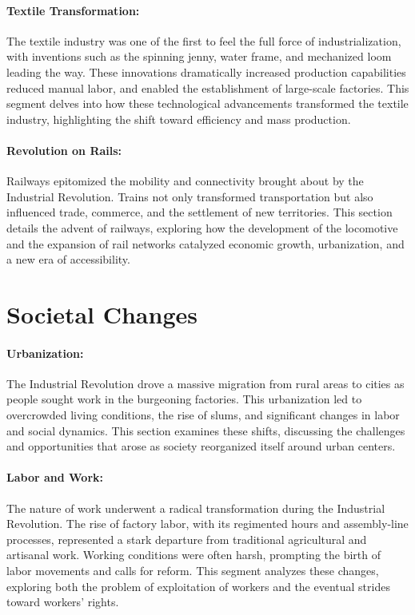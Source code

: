 \documentclass[a4paper,12pt]{book}
\begin{document}
\paragraph{Textile Transformation:}
The textile industry was one of the first to feel the full force of industrialization, with inventions such as the spinning jenny, water frame, and mechanized loom leading the way. These innovations dramatically increased production capabilities reduced manual labor, and enabled the establishment of large-scale factories. This segment delves into how these technological advancements transformed the textile industry, highlighting the shift toward efficiency and mass production.

\paragraph{Revolution on Rails:}
Railways epitomized the mobility and connectivity brought about by the Industrial Revolution. Trains not only transformed transportation but also influenced trade, commerce, and the settlement of new territories. This section details the advent of railways, exploring how the development of the locomotive and the expansion of rail networks catalyzed economic growth, urbanization, and a new era of accessibility.

\section*{Societal Changes}

\paragraph{Urbanization:}
The Industrial Revolution drove a massive migration from rural areas to cities as people sought work in the burgeoning factories. This urbanization led to overcrowded living conditions, the rise of slums, and significant changes in labor and social dynamics. This section examines these shifts, discussing the challenges and opportunities that arose as society reorganized itself around urban centers.

\paragraph{Labor and Work:}
The nature of work underwent a radical transformation during the Industrial Revolution. The rise of factory labor, with its regimented hours and assembly-line processes, represented a stark departure from traditional agricultural and artisanal work. Working conditions were often harsh, prompting the birth of labor movements and calls for reform. This segment analyzes these changes, exploring both the problem of exploitation of workers and the eventual strides toward workers’ rights.
\end{document}
